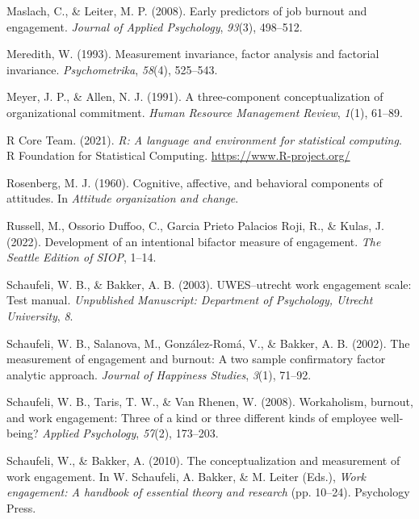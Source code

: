\documentclass[
  man]{apa7}
\newlength{\cslhangindent}
\newlength{\cslentryspacingunit} %
\newenvironment{CSLReferences}[2] %
 {%
  \setlength{\parindent}{0pt}
  \ifodd #1
  \let\oldpar\par
  \def\par{\hangindent=\cslhangindent\oldpar}
  \fi
  \setlength{\parskip}{#2\cslentryspacingunit}
 }%
 {}
\begin{document}
\begin{CSLReferences}{1}{0}
\leavevmode{}%
Maslach, C., \& Leiter, M. P. (2008). Early predictors of job burnout and engagement. \emph{Journal of Applied Psychology}, \emph{93}(3), 498--512.

\leavevmode{}%
Meredith, W. (1993). Measurement invariance, factor analysis and factorial invariance. \emph{Psychometrika}, \emph{58}(4), 525--543.

\leavevmode{}%
Meyer, J. P., \& Allen, N. J. (1991). A three-component conceptualization of organizational commitment. \emph{Human Resource Management Review}, \emph{1}(1), 61--89.

\leavevmode{}%
R Core Team. (2021). \emph{R: A language and environment for statistical computing}. R Foundation for Statistical Computing. \url{https://www.R-project.org/}

\leavevmode{}%
Rosenberg, M. J. (1960). Cognitive, affective, and behavioral components of attitudes. In \emph{Attitude organization and change}.

\leavevmode{}%
Russell, M., Ossorio Duffoo, C., Garcia Prieto Palacios Roji, R., \& Kulas, J. (2022). Development of an intentional bifactor measure of engagement. \emph{The Seattle Edition of SIOP}, 1--14.

\leavevmode{}%
Schaufeli, W. B., \& Bakker, A. B. (2003). {UWES}--utrecht work engagement scale: Test manual. \emph{Unpublished Manuscript: Department of Psychology, Utrecht University}, \emph{8}.

\leavevmode{}%
Schaufeli, W. B., Salanova, M., González-Romá, V., \& Bakker, A. B. (2002). The measurement of engagement and burnout: A two sample confirmatory factor analytic approach. \emph{Journal of Happiness Studies}, \emph{3}(1), 71--92.

\leavevmode{}%
Schaufeli, W. B., Taris, T. W., \& Van Rhenen, W. (2008). Workaholism, burnout, and work engagement: Three of a kind or three different kinds of employee well-being? \emph{Applied Psychology}, \emph{57}(2), 173--203.

\leavevmode{}%
Schaufeli, W., \& Bakker, A. (2010). The conceptualization and measurement of work engagement. In W. Schaufeli, A. Bakker, \& M. Leiter (Eds.), \emph{Work engagement: A handbook of essential theory and research} (pp. 10--24). Psychology Press.


\end{CSLReferences}
\end{document}
